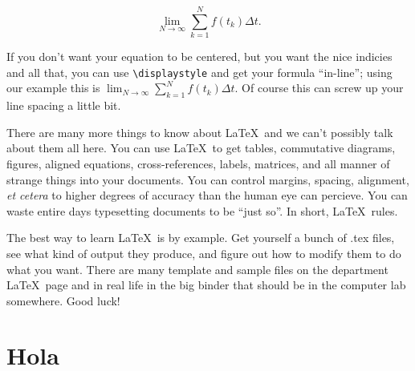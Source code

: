 \documentclass{article}
\begin{document}
$$\lim_{N \to \infty} \sum_{k=1}^N f(t_k) \Delta t.$$

If you don't want your equation to be centered, but you want the nice 
indicies and all that, you can use \verb|\displaystyle| and get your 
formula ``in-line''; using our example this is 
$\displaystyle \lim_{N \to \infty} \sum_{k=1}^N f(t_k) \Delta t.$  Of 
course this can screw up your line spacing a little bit.

There are many more things to know about \LaTeX\ and we can't 
possibly talk about them all here.
You can use \LaTeX\ to get tables, commutative diagrams, figures, 
aligned equations, cross-references, labels, matrices, and all manner 
of strange things into your documents.  You can control margins, 
spacing, alignment, {\it et cetera} to higher degrees of accuracy than 
the human eye can percieve.  You can waste entire days typesetting 
documents to be ``just so''.  In short, \LaTeX\ rules.

The best way to learn \LaTeX\ is by example. Get yourself a bunch
of .tex files, see what kind of output they produce, and figure out how
to modify them to do what you want.  There are many template and 
sample files on the department \LaTeX\ page and in real life in the 
big binder that should be in the computer lab somewhere.  Good luck!


\section{Hola}
\end{document}
